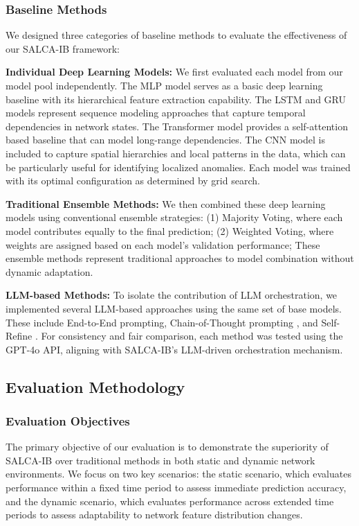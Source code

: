 \documentclass[conference]{IEEEtran}
\begin{document}
\subsubsection{Baseline Methods}
We designed three categories of baseline methods to evaluate the effectiveness of our SALCA-IB framework:

\textbf{Individual Deep Learning Models:} We first evaluated each model from our model pool independently. The MLP model serves as a basic deep learning baseline with its hierarchical feature extraction capability. The LSTM and GRU models represent sequence modeling approaches that capture temporal dependencies in network states. The Transformer model provides a self-attention based baseline that can model long-range dependencies. The CNN model is included to capture spatial hierarchies and local patterns in the data, which can be particularly useful for identifying localized anomalies. Each model was trained with its optimal configuration as determined by grid search.

\textbf{Traditional Ensemble Methods:} We then combined these deep learning models using conventional ensemble strategies:
(1) Majority Voting, where each model contributes equally to the final prediction;
(2) Weighted Voting, where weights are assigned based on each model's validation performance;
These ensemble methods represent traditional approaches to model combination without dynamic adaptation.

\textbf{LLM-based Methods:} To isolate the contribution of LLM orchestration, we implemented several LLM-based approaches using the same set of base models. These include End-to-End prompting, Chain-of-Thought prompting \cite{chen2023}, and Self-Refine \cite{madaan2023}. For consistency and fair comparison, each method was tested using the GPT-4o API, aligning with SALCA-IB's LLM-driven orchestration mechanism.

\subsection{Evaluation Methodology}

\subsubsection{Evaluation Objectives}
The primary objective of our evaluation is to demonstrate the superiority of SALCA-IB over traditional methods in both static and dynamic network environments. We focus on two key scenarios: the static scenario, which evaluates performance within a fixed time period to assess immediate prediction accuracy, and the dynamic scenario, which evaluates performance across extended time periods to assess adaptability to network feature distribution changes.
\end{document}
